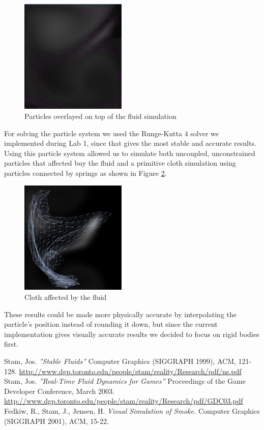 \documentclass[a4paper,twoside,11pt,twocolumn]{article}
\begin{document}
\begin{figure}[H]
	\centering
	\includegraphics[width=0.45\textwidth]{particles}
	\caption{Particles overlayed on top of the fluid simulation}
	\label{fig:particles}
\end{figure}

For solving the particle system we used the Runge-Kutta 4 solver we implemented during Lab 1, since that gives the most stable and accurate results. Using this particle system allowed us to simulate both uncoupled, unconstrained particles that affected buy the fluid and a primitive cloth simulation using particles connected by springs as shown in Figure \ref{fig:cloth}.

\begin{figure}[H]
	\centering
	\includegraphics[width=0.45\textwidth]{cloth}
	\caption{Cloth affected by the fluid}
	\label{fig:cloth}
\end{figure}

These results could be made more physically accurate by interpolating the particle's position instead of rounding it down, but since the current implementation gives visually accurate results we decided to focus on rigid bodies first.

\begin{thebibliography}{9}
		Stam, Jos. \emph{''Stable Fluids''} Computer Graphics (SIGGRAPH 1999), ACM, 121-128. \url{http://www.dgp.toronto.edu/people/stam/reality/Research/pdf/ns.pdf}
		Stam, Jos. \emph{''Real-Time Fluid Dynamics for Games''} Proceedings of the Game Developer Conference, March 2003. \url{http://www.dgp.toronto.edu/people/stam/reality/Research/pdf/GDC03.pdf}
		Fedkiw, R., Stam, J., Jensen, H. \emph{Visual Simulation of Smoke.} Computer Graphics (SIGGRAPH 2001), ACM, 15-22.
	
\end{thebibliography}
\end{document}
